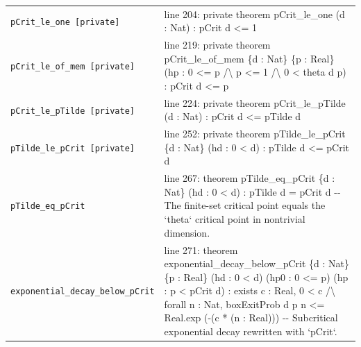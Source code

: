 \documentclass[10pt]{article}
\begin{document}
\begin{longtable}{>{\raggedright\arraybackslash}p{} >{\raggedright\arraybackslash}p{}}
\texttt{pCrit\_\allowbreak{}le\_\allowbreak{}one [private]} & {\ttfamily\scriptsize line 204:\allowbreak{} private theorem pCrit\_\allowbreak{}le\_\allowbreak{}one (\allowbreak{}d :\allowbreak{} Nat)\allowbreak{} :\allowbreak{} pCrit d <=\allowbreak{} 1} \\[0.45em]
\texttt{pCrit\_\allowbreak{}le\_\allowbreak{}of\_\allowbreak{}mem [private]} & {\ttfamily\scriptsize line 219:\allowbreak{} private theorem pCrit\_\allowbreak{}le\_\allowbreak{}of\_\allowbreak{}mem \{d :\allowbreak{} Nat\} \{p :\allowbreak{} Real\} (\allowbreak{}hp :\allowbreak{} 0 <=\allowbreak{} p /\allowbreak{}\textbackslash{} p <=\allowbreak{} 1 /\allowbreak{}\textbackslash{} 0 < theta d p)\allowbreak{} :\allowbreak{} pCrit d <=\allowbreak{} p} \\[0.45em]
\texttt{pCrit\_\allowbreak{}le\_\allowbreak{}pTilde [private]} & {\ttfamily\scriptsize line 224:\allowbreak{} private theorem pCrit\_\allowbreak{}le\_\allowbreak{}pTilde (\allowbreak{}d :\allowbreak{} Nat)\allowbreak{} :\allowbreak{} pCrit d <=\allowbreak{} pTilde d} \\[0.45em]
\texttt{pTilde\_\allowbreak{}le\_\allowbreak{}pCrit [private]} & {\ttfamily\scriptsize line 252:\allowbreak{} private theorem pTilde\_\allowbreak{}le\_\allowbreak{}pCrit \{d :\allowbreak{} Nat\} (\allowbreak{}hd :\allowbreak{} 0 < d)\allowbreak{} :\allowbreak{} pTilde d <=\allowbreak{} pCrit d} \\[0.45em]
\texttt{pTilde\_\allowbreak{}eq\_\allowbreak{}pCrit} & {\ttfamily\scriptsize line 267:\allowbreak{} theorem pTilde\_\allowbreak{}eq\_\allowbreak{}pCrit \{d :\allowbreak{} Nat\} (\allowbreak{}hd :\allowbreak{} 0 < d)\allowbreak{} :\allowbreak{} pTilde d =\allowbreak{} pCrit d -\allowbreak{}-\allowbreak{} The finite-\allowbreak{}set critical point equals the `theta` critical point in nontrivial dimension.\allowbreak{}} \\[0.45em]
\texttt{exponential\_\allowbreak{}decay\_\allowbreak{}below\_\allowbreak{}pCrit} & {\ttfamily\scriptsize line 271:\allowbreak{} theorem exponential\_\allowbreak{}decay\_\allowbreak{}below\_\allowbreak{}pCrit \{d :\allowbreak{} Nat\} \{p :\allowbreak{} Real\} (\allowbreak{}hd :\allowbreak{} 0 < d)\allowbreak{} (\allowbreak{}hp0 :\allowbreak{} 0 <=\allowbreak{} p)\allowbreak{} (\allowbreak{}hp :\allowbreak{} p < pCrit d)\allowbreak{} :\allowbreak{} exists c :\allowbreak{} Real,\allowbreak{} 0 < c /\allowbreak{}\textbackslash{} forall n :\allowbreak{} Nat,\allowbreak{} boxExitProb d p n <=\allowbreak{} Real.\allowbreak{}exp (\allowbreak{}-\allowbreak{}(\allowbreak{}c *\allowbreak{} (\allowbreak{}n :\allowbreak{} Real)\allowbreak{})\allowbreak{})\allowbreak{} -\allowbreak{}-\allowbreak{} Subcritical exponential decay rewritten with `pCrit`.\allowbreak{}} \\[0.45em]

\end{longtable}
\end{document}
